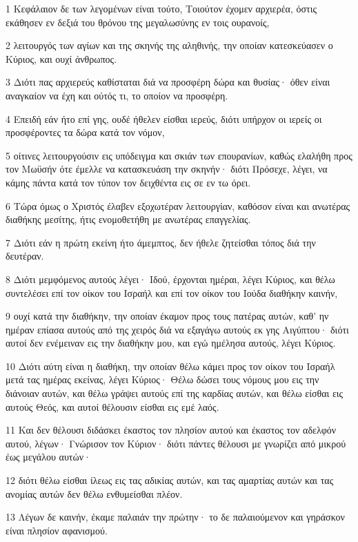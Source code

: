 \par 1 Κεφάλαιον δε των λεγομένων είναι τούτο, Τοιούτον έχομεν αρχιερέα, όστις εκάθησεν εν δεξιά του θρόνου της μεγαλωσύνης εν τοις ουρανοίς,
\par 2 λειτουργός των αγίων και της σκηνής της αληθινής, την οποίαν κατεσκεύασεν ο Κύριος, και ουχί άνθρωπος.
\par 3 Διότι πας αρχιερεύς καθίσταται διά να προσφέρη δώρα και θυσίας· όθεν είναι αναγκαίον να έχη και ούτός τι, το οποίον να προσφέρη.
\par 4 Επειδή εάν ήτο επί γης, ουδέ ήθελεν είσθαι ιερεύς, διότι υπήρχον οι ιερείς οι προσφέροντες τα δώρα κατά τον νόμον,
\par 5 οίτινες λειτουργούσιν εις υπόδειγμα και σκιάν των επουρανίων, καθώς ελαλήθη προς τον Μωϋσήν ότε έμελλε να κατασκευάση την σκηνήν· διότι Πρόσεχε, λέγει, να κάμης πάντα κατά τον τύπον τον δειχθέντα εις σε εν τω όρει.
\par 6 Τώρα όμως ο Χριστός έλαβεν εξοχωτέραν λειτουργίαν, καθόσον είναι και ανωτέρας διαθήκης μεσίτης, ήτις ενομοθετήθη με ανωτέρας επαγγελίας.
\par 7 Διότι εάν η πρώτη εκείνη ήτο άμεμπτος, δεν ήθελε ζητείσθαι τόπος διά την δευτέραν.
\par 8 Διότι μεμφόμενος αυτούς λέγει· Ιδού, έρχονται ημέραι, λέγει Κύριος, και θέλω συντελέσει επί τον οίκον του Ισραήλ και επί τον οίκον του Ιούδα διαθήκην καινήν,
\par 9 ουχί κατά την διαθήκην, την οποίαν έκαμον προς τους πατέρας αυτών, καθ' ην ημέραν επίασα αυτούς από της χειρός διά να εξαγάγω αυτούς εκ γης Αιγύπτου· διότι αυτοί δεν ενέμειναν εις την διαθήκην μου, και εγώ ημέλησα αυτούς, λέγει Κύριος.
\par 10 Διότι αύτη είναι η διαθήκη, την οποίαν θέλω κάμει προς τον οίκον του Ισραήλ μετά τας ημέρας εκείνας, λέγει Κύριος· Θέλω δώσει τους νόμους μου εις την διάνοιαν αυτών, και θέλω γράψει αυτούς επί της καρδίας αυτών, και θέλω είσθαι εις αυτούς Θεός, και αυτοί θέλουσιν είσθαι εις εμέ λαός.
\par 11 Και δεν θέλουσι διδάσκει έκαστος τον πλησίον αυτού και έκαστος τον αδελφόν αυτού, λέγων· Γνώρισον τον Κύριον· διότι πάντες θέλουσι με γνωρίζει από μικρού έως μεγάλου αυτών·
\par 12 διότι θέλω είσθαι ίλεως εις τας αδικίας αυτών, και τας αμαρτίας αυτών και τας ανομίας αυτών δεν θέλω ενθυμείσθαι πλέον.
\par 13 Λέγων δε καινήν, έκαμε παλαιάν την πρώτην· το δε παλαιούμενον και γηράσκον είναι πλησίον αφανισμού.

